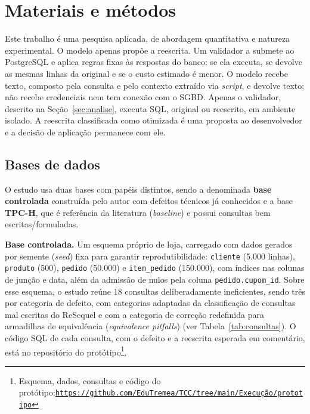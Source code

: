 \documentclass[12pt]{article}
\begin{document}
\section{Materiais e métodos}
\label{sec:metodo}

Este trabalho é uma pesquisa aplicada, de abordagem quantitativa e natureza experimental. O modelo apenas propõe a reescrita. Um validador a submete ao PostgreSQL e aplica regras fixas às respostas do banco: se ela executa, se devolve as mesmas linhas da original e se o custo estimado é menor. O modelo recebe texto, composto pela consulta e pelo contexto extraído via \textit{script}, e devolve texto; não recebe credenciais nem tem conexão com o SGBD. Apenas o validador, descrito na Seção~\ref{sec:analise}, executa SQL, original ou reescrito, em ambiente isolado. A reescrita classificada como otimizada é uma proposta ao desenvolvedor e a decisão de aplicação permanece com ele.

\subsection{Bases de dados}
\label{sec:bases}

O estudo usa duas bases com papéis distintos, sendo a denominada \textbf{base controlada} construída pelo autor com defeitos técnicos já conhecidos e a base \textbf{TPC-H}, que é referência da literatura (\textit{baseline}) e possui consultas bem escritas/formuladas.

\textbf{Base controlada.} Um esquema próprio de loja, carregado com dados gerados por semente (\textit{seed}) fixa para garantir reprodutibilidade: \texttt{cliente} (5.000 linhas), \texttt{produto} (500), \texttt{pedido} (50.000) e \texttt{item\_pedido} (150.000), com índices nas colunas de junção e data, além da admissão de nulos pela coluna \texttt{pedido.cupom\_id}. Sobre esse esquema, o estudo reúne 18 consultas deliberadamente ineficientes, sendo três por categoria de defeito, com categorias adaptadas da classificação de consultas mal escritas do ReSequel \cite{fathollahzadeh2026resequel} e com a categoria de correção redefinida para armadilhas de equivalência (\textit{equivalence pitfalls}) (ver Tabela~\ref{tab:consultas}). O código SQL de cada consulta, com o defeito e a reescrita esperada em comentário, está no repositório do protótipo\footnote{Esquema, dados, consultas e código do protótipo:\newline\href{https://github.com/EduTremea/TCC/tree/main/Execu\%C3\%A7\%C3\%A3o/prototipo}{\texttt{https://github.com/EduTremea/TCC/tree/main/Execução/prototipo}}}.
\end{document}
